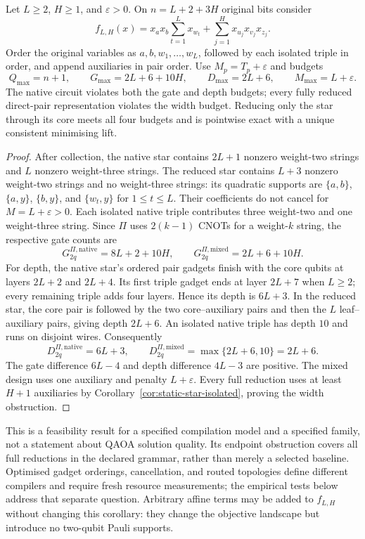 \begin{corollary}
\label{cor:compiled-star-isolated}
Let $L\geq2$, $H\geq1$, and $\varepsilon>0$. On
$n=L+2+3H$ original bits consider
\[
 f_{L,H}(x)=x_ax_b\sum_{t=1}^{L}x_{w_t}
              +\sum_{j=1}^{H}x_{u_j}x_{v_j}x_{z_j}.
\]
Order the original variables as $a,b,w_1,\ldots,w_L$, followed by each
isolated triple in order, and append auxiliaries in pair order.
Use $M_p=T_p+\varepsilon$ and budgets
\begin{equation}
 Q_{\max}=n+1,\qquad G_{\max}=2L+6+10H,\qquad
 D_{\max}=2L+6,\qquad M_{\max}=L+\varepsilon.
 \label{eq:compiled-mixed-only-budgets}
\end{equation}
The native circuit violates both the gate and depth budgets; every fully
reduced direct-pair representation violates the width budget. Reducing only
the star through its core meets all four budgets and is pointwise exact
with a unique consistent minimising lift.
\end{corollary}
\begin{proof}
After collection, the native star contains $2L+1$ nonzero weight-two strings
and $L$ nonzero weight-three strings. The reduced star contains $L+3$
nonzero weight-two strings and no weight-three strings: its quadratic
supports are $\{a,b\}$, $\{a,y\}$, $\{b,y\}$, and
$\{w_t,y\}$ for $1\leq t\leq L$. Their coefficients do not cancel for
$M=L+\varepsilon>0$. Each isolated native triple contributes three
weight-two and one weight-three string. Since $\Pi$ uses $2(k-1)$ CNOTs
for a weight-$k$ string, the respective gate counts are
\[
 G_{2q}^{\Pi,\mathrm{native}}=8L+2+10H,
 \qquad G_{2q}^{\Pi,\mathrm{mixed}}=2L+6+10H.
\]
For depth, the native star's ordered pair gadgets finish with the core
qubits at layers $2L+2$ and $2L+4$. Its first triple gadget ends at layer
$2L+7$ when $L\geq2$; every remaining triple adds four layers.
Hence its depth is $6L+3$. In the reduced star, the core pair is followed
by the two core--auxiliary pairs and then the $L$ leaf--auxiliary pairs,
giving depth $2L+6$. An isolated native triple has depth $10$ and runs on
disjoint wires. Consequently
\[
 D_{2q}^{\Pi,\mathrm{native}}=6L+3,
 \qquad D_{2q}^{\Pi,\mathrm{mixed}}=\max\{2L+6,10\}=2L+6.
\]
The gate difference $6L-4$ and depth difference $4L-3$ are positive.
The mixed design uses one auxiliary and penalty $L+\varepsilon$.
Every full reduction uses at least $H+1$ auxiliaries by
Corollary~\ref{cor:static-star-isolated}, proving the width obstruction.
\end{proof}

This is a feasibility result for a specified compilation model and a
specified family, not a statement about QAOA solution quality. Its endpoint
obstruction covers all full reductions in the declared grammar, rather
than merely a selected baseline. Optimised gadget orderings, cancellation,
and routed topologies define different compilers and require fresh resource
measurements; the empirical tests below address that separate question.
Arbitrary affine terms may be added to $f_{L,H}$ without changing this
corollary: they change the objective landscape but introduce no two-qubit
Pauli supports.
